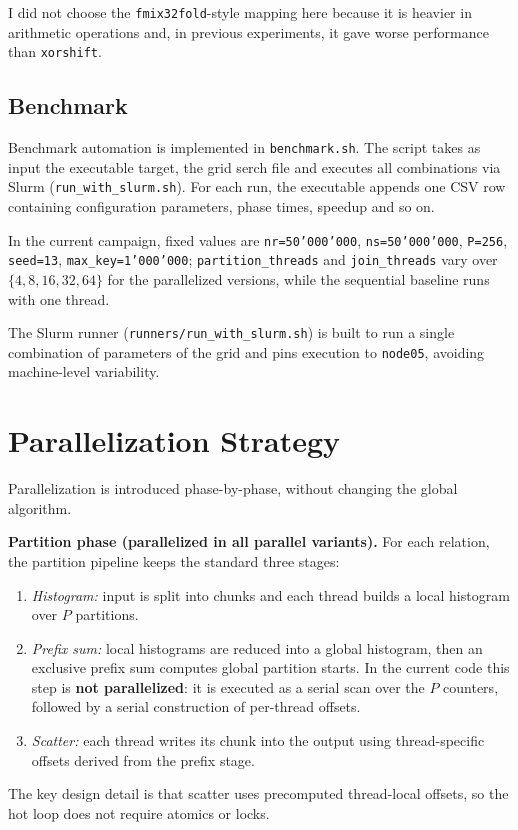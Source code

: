 \documentclass[11pt,a4paper]{article}
\begin{document}
I did not choose the \texttt{fmix32fold}-style mapping here because it is heavier in arithmetic operations and, in previous experiments, it gave worse performance than \texttt{xorshift}.

\subsection{Benchmark}
Benchmark automation is implemented in \texttt{benchmark.sh}. The script takes as input the executable target, the grid serch file and executes all combinations via Slurm (\texttt{run\_with\_slurm.sh}).  
For each run, the executable appends one CSV row containing configuration parameters, phase times, speedup and so on.

In the current campaign, fixed values are \texttt{nr=50'000'000}, \texttt{ns=50'000'000}, \texttt{P=256}, \texttt{seed=13}, \texttt{max\_key=1'000'000}; \texttt{partition\_threads} and \texttt{join\_threads} vary over \(\{4,8,16,32,64\}\) for the parallelized versions, while the sequential baseline runs with one thread.

The Slurm runner (\texttt{runners/run\_with\_slurm.sh}) is built to run a single combination of parameters of the grid and pins execution to \texttt{node05}, avoiding machine-level variability.


\section{Parallelization Strategy}
Parallelization is introduced phase-by-phase, without changing the global algorithm.

\textbf{Partition phase (parallelized in all parallel variants).}
For each relation, the partition pipeline keeps the standard three stages:
\begin{enumerate}
    \item \textit{Histogram:} input is split into chunks and each thread builds a local histogram over \(P\) partitions.
    \item \textit{Prefix sum:} local histograms are reduced into a global histogram, then an exclusive prefix sum computes global partition starts. In the current code this step is \textbf{not parallelized}: it is executed as a serial scan over the \(P\) counters, followed by a serial construction of per-thread offsets.
    \item \textit{Scatter:} each thread writes its chunk into the output using thread-specific offsets derived from the prefix stage.
\end{enumerate}
The key design detail is that scatter uses precomputed thread-local offsets, so the hot loop does not require atomics or locks.
\end{document}
